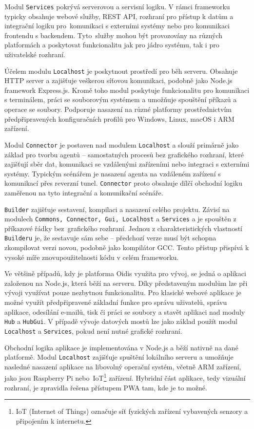 Modul \texttt{Services} pokrývá serverovou a servisní logiku. V rámci frameworku typicky obsahuje webové služby, REST API, rozhraní pro přístup k datům a integrační logiku pro~komunikaci s externími systémy nebo pro komunikaci frontendu s backendem. Tyto~služby mohou být provozovány na různých platformách a poskytovat funkcionalitu jak pro jádro systému, tak i pro uživatelské rozhraní.

Účelem modulu \texttt{Localhost} je poskytnout prostředí pro běh serveru. Obsahuje HTTP server a zajišťuje veškerou síťovou komunikaci, podobně jako Node.js framework Express.js. Kromě toho modul poskytuje funkcionalitu pro komunikaci s terminálem, práci se souborovým systémem a umožňuje spouštění příkazů a operace se soubory. Podporuje nasazení na různé platformy prostřednictvím předpřipravených konfiguračních profilů pro Windows, Linux, macOS i ARM zařízení.

Modul \texttt{Connector} je postaven nad modulem \texttt{Localhost} a slouží primárně jako základ pro tvorbu agentů -- samostatných procesů bez grafického 
rozhraní, které zajišťují sběr dat, komunikaci se vzdálenými zařízeními 
nebo integraci s externími systémy. Typickým scénářem je nasazení 
agenta na vzdáleném zařízení s komunikací přes reverzní tunel. \texttt{Connector} proto obsahuje dílčí obchodní logiku zaměřenou na tyto integrační a komunikační scénáře.

\texttt{Builder} zajišťuje sestavení, kompilaci a nasazení celého projektu. Závisí na modulech \texttt{Commons, Connector, Gui, Localhost} a \texttt{Services} a je spouštěn z příkazové řádky bez~grafického rozhraní. Jednou z charakteristických vlastností \texttt{Builderu} je, že sestavuje sám sebe -- předchozí verze musí být schopna zkompilovat verzi novou, podobně jako kompilátor GCC. Tento přístup přispívá k vysoké míře znovupoužitelnosti kódu v celém frameworku.

Ve většině případů, kdy je platforma Oidis využita pro vývoj, se jedná o aplikaci založenou na Node.js, která běží na serveru. Díky představeným modulům lze při vývoji využívat pouze nezbytnou funkcionalitu. Pro klasické webové aplikace je možné využít předpřipravené základní funkce pro správu uživatelů, správu aplikace, odesílání e-mailů, tisk či práci se soubory a stavět aplikaci nad moduly \texttt{Hub} a \texttt{HubGui}. V případě vývoje datových mostů lze jako základ použít modul \texttt{Localhost} a \texttt{Services}, pokud není nutné grafické rozhraní.

Obchodní logika aplikace je implementována v Node.js a běží nativně na dané platformě. Modul \texttt{Localhost} zajišťuje spuštění lokálního serveru a umožňuje nasledné nasazení aplikace na libovolný operační systém, včetně ARM zařízení, jako jsou Raspberry Pi nebo~IoT\footnote{IoT (Internet of Things) označuje síť fyzických zařízení vybavených senzory a připojením k internetu.} zařízení. Hybridní část aplikace, tedy vizuální rozhraní, je zpravidla řešena přístupem PWA tam, kde je to možné.

